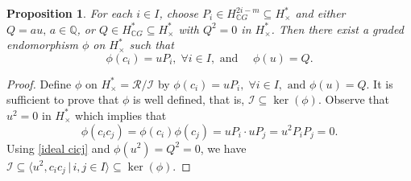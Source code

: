 \documentclass{amsart}
\newtheorem{proposition}[theorem]{Proposition}
\begin{document}
	
	
	\begin{proposition}
		For each $i\in I$, choose $P_i \in H^{2i-m}_{\mathbb C G} \subseteq H^*_\times$ and either $Q = au,\, a\in \mathbb Q$, or  $Q\in H^*_{\mathbb CG}\subseteq H^*_{\times}$ with $Q^2=0$  in $ H^*_{\times}$. Then there exist a graded endomorphism $\phi$ on $H^*_\times$ such that 
		\[
		\phi(c_i)=uP_i, \; \forall i\in I, \text{ and  } \quad \phi(u)=Q.
		\]
	\end{proposition}
	\begin{proof}
		Define $\phi$ on $H^*_{\times} = \mathcal{R}/\mathcal{I}$ by $\phi(c_i)=uP_i, \; \forall i\in I, \text{ and } \phi(u)=Q.$ It is sufficient to prove that $\phi$ is well defined, that is, $\mathcal{I}\subseteq \ker (\phi)$. Observe that $u^2 =0$ in $H^*_{\times}$ which implies that \begin{equation}\label{ideal cicj}
			\phi(c_i c_j) = \phi(c_i) \phi(c_j) = uP_i \cdot uP_j = u^2 P_i P_j = 0.
		\end{equation} Using \eqref{ideal cicj} and $\phi(u^2)=Q^2 =0$, we have $\mathcal{I}\subseteq \langle u^2, c_i c_j \,|\, i,j \in I \rangle \subseteq \ker(\phi).$ 
	\end{proof}
	
	
\end{document}
